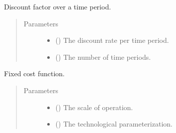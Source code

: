 \documentclass[letterpaper,10pt,english]{sphinxmanual}
\begin{document}

\begin{fulllineitems}
\label{\detokenize{technology:technology.pv_residential_simple.discount}}
Discount factor over a time period.
\begin{quote}\begin{description}
\item[{Parameters}] \leavevmode\begin{itemize}
\item {} 
 () \textendash{} The discount rate per time period.

\item {} 
 () \textendash{} The number of time periods.

\end{itemize}

\end{description}\end{quote}

\end{fulllineitems}


\begin{fulllineitems}
\label{\detokenize{technology:technology.pv_residential_simple.fixed_cost}}
Fixed cost function.
\begin{quote}\begin{description}
\item[{Parameters}] \leavevmode\begin{itemize}
\item {} 
 () \textendash{} The scale of operation.

\item {} 
 () \textendash{} The technological parameterization.

\end{itemize}

\end{description}\end{quote}

\end{fulllineitems}
\end{document}
